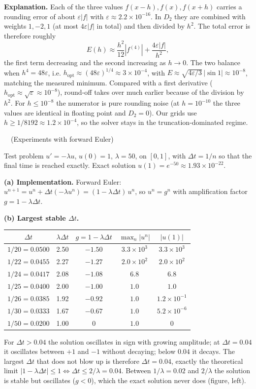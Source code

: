 \documentclass[11pt,a4paper]{article}
\newcommand{\task}[2]{\vspace{10pt}{\Large\bfseries Task #1}\ \ {\large(#2)}\par\vspace{4pt}}
\begin{document}
\textbf{Explanation.} Each of the three values $f(x-h), f(x), f(x+h)$ carries a rounding error of
about $\varepsilon|f|$ with $\varepsilon\approx2.2\times10^{-16}$. In $D_2$ they are combined with
weights $1,-2,1$ (at most $4\varepsilon|f|$ in total) and then divided by $h^2$. The total error is
therefore roughly
\[
E(h)\approx \frac{h^2}{12}|f^{(4)}| + \frac{4\varepsilon|f|}{h^2},
\]
the first term decreasing and the second increasing as $h\to0$. The two balance when
$h^4 = 48\varepsilon$, i.e. $h_{\text{opt}}\approx(48\varepsilon)^{1/4}\approx3\times10^{-4}$, with
$E\approx\sqrt{4\varepsilon/3}\,|\!\sin 1|\approx10^{-8}$, matching the measured minimum.
Compared with a first derivative ($h_{\text{opt}}\approx\sqrt\varepsilon\approx10^{-8}$),
round-off takes over much earlier because of the division by $h^2$. For $h\le10^{-8}$ the
numerator is pure rounding noise (at $h=10^{-10}$ the three values are identical in floating point and
$D_2=0$). Our grids use $h\ge1/8192\approx1.2\times10^{-4}$, so the solver stays in the
truncation-dominated regime.

\task{4.1}{Experiments with forward Euler}
Test problem $u'=-\lambda u$, $u(0)=1$, $\lambda=50$, on $[0,1]$, with $\Delta t=1/n$ so that the
final time is reached exactly. Exact solution $u(1)=e^{-50}\approx1.93\times10^{-22}$.

\textbf{(a) Implementation.} Forward Euler: $u^{n+1}=u^n+\Delta t(-\lambda u^n)=(1-\lambda\Delta t)\,u^n$,
so $u^n=g^n$ with amplification factor $g=1-\lambda\Delta t$.

\textbf{(b) Largest stable $\Delta t$.}
\begin{center}\small
\begin{tabular}{ccccc}\toprule
$\Delta t$ & $\lambda\Delta t$ & $g=1-\lambda\Delta t$ & $\max_n|u^n|$ & $|u(1)|$\\\midrule
$1/20=0.0500$ & 2.50 & $-1.50$ & $3.3\times10^{3}$ & $3.3\times10^{3}$\\
$1/22=0.0455$ & 2.27 & $-1.27$ & $2.0\times10^{2}$ & $2.0\times10^{2}$\\
$1/24=0.0417$ & 2.08 & $-1.08$ & $6.8$ & $6.8$\\
$1/25=0.0400$ & 2.00 & $-1.00$ & $1.0$ & $1.0$\\
$1/26=0.0385$ & 1.92 & $-0.92$ & $1.0$ & $1.2\times10^{-1}$\\
$1/30=0.0333$ & 1.67 & $-0.67$ & $1.0$ & $5.2\times10^{-6}$\\
$1/50=0.0200$ & 1.00 & $0$ & $1.0$ & $0$\\\bottomrule
\end{tabular}
\end{center}
For $\Delta t>0.04$ the solution oscillates in sign with growing amplitude; at $\Delta t=0.04$ it
oscillates between $+1$ and $-1$ without decaying; below $0.04$ it decays. The largest $\Delta t$ that does not
blow up is therefore $\Delta t=0.04$, exactly the theoretical limit
$|1-\lambda\Delta t|\le1\iff\Delta t\le2/\lambda=0.04$. Between $1/\lambda=0.02$ and $2/\lambda$
the solution is stable but oscillates ($g<0$), which the exact solution never does
(figure, left).
\end{document}
